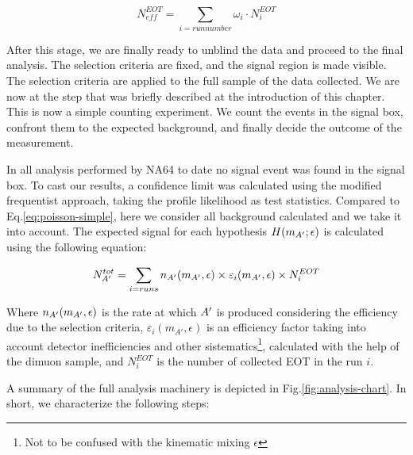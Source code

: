 \begin{equation}
  \label{eq:effective-eots}
  N_{eff}^{EOT} = \sum_{i=run number} \omega_i \cdot N^{EOT}_i
\end{equation}

After this stage, we are finally ready to unblind the data and proceed to the final analysis. The selection criteria are fixed, and the signal region is made visible. The selection criteria are applied to the full sample of the data collected. We are now at the step that was briefly described at the introduction of this chapter. This is now a simple counting experiment. We count the events in the signal box, confront them to the expected background, and finally decide the outcome of the measurement.

In all analysis performed by NA64 to date \cite{Banerjee:2020fue,Banerjee:2019hmi,NA64:2019imj,na64-prd,Banerjee:2018vgk,Banerjee:2016tad} no signal event was found in the signal box. To cast our results, a confidence limit was calculated using the modified frequentist approach, taking the profile likelihood as test statistics\cite{JUNK1999435,Read_2002,Cowan:2010js}. Compared to Eq.\ref{eq:poisson-simple}, here we consider all background calculated and we take it into account. The expected signal for each hypothesis $H(m_{A'};\epsilon)$ is calculated using the following equation:

\begin{equation}
  \label{eq:dm-expected-signal}
  N^{tot}_{A'} = \sum_{i=runs} n_{A'}(m_{A'},\epsilon) \times \varepsilon_i(m_{A'},\epsilon) \times N^{EOT}_i
\end{equation}

Where $n_{A'}(m_{A'},\epsilon)$ is the rate at which $A'$ is produced considering the efficiency due to the selection criteria, $\varepsilon_i(m_{A'},\epsilon)$ is an efficiency factor taking into account detector inefficiencies and other sistematics\footnote{Not to be confused with the kinematic mixing $\epsilon$}, calculated with the help of the dimuon sample, and $N^{EOT}_i$ is the number of collected EOT in the run $i$.

A summary of the full analysis machinery is depicted in Fig.\ref{fig:analysis-chart}. In short, we characterize the following steps:

